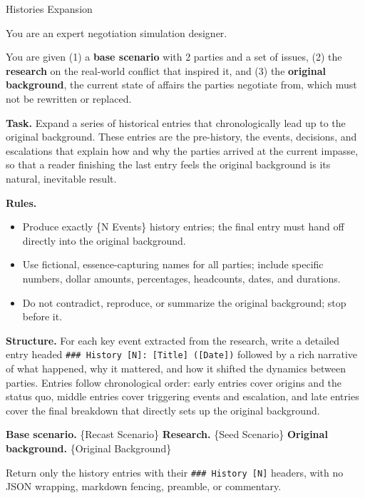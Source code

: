 \documentclass{llmxive}
\begin{document}
\begin{table}[p]
\centering
\begin{promptbox}{Histories Expansion}
\begin{userbox}
\scriptsize
You are an expert negotiation simulation designer.

\smallskip
You are given (1) a \textbf{base scenario} with 2 parties and a set of issues, (2) the \textbf{research} on the real-world conflict that inspired it, and (3) the \textbf{original background}, the current state of affairs the parties negotiate from, which must not be rewritten or replaced.

\smallskip
\textbf{Task.} Expand a series of historical entries that chronologically lead up to the original background. These entries are the pre-history, the events, decisions, and escalations that explain how and why the parties arrived at the current impasse, so that a reader finishing the last entry feels the original background is its natural, inevitable result.

\smallskip
\textbf{Rules.}
\begin{itemize}[leftmargin=*, noitemsep, topsep=2pt]
\item Produce exactly \{N Events\} history entries; the final entry must hand off directly into the original background.
\item Use fictional, essence-capturing names for all parties; include specific numbers, dollar amounts, percentages, headcounts, dates, and durations.
\item Do not contradict, reproduce, or summarize the original background; stop before it.
\end{itemize}

\smallskip
\textbf{Structure.} For each key event extracted from the research, write a detailed entry headed \texttt{\#\#\# History [N]: [Title] ([Date])} followed by a rich narrative of what happened, why it mattered, and how it shifted the dynamics between parties. Entries follow chronological order: early entries cover origins and the status quo, middle entries cover triggering events and escalation, and late entries cover the final breakdown that directly sets up the original background.

\smallskip
\textbf{Base scenario.} \{Recast Scenario\} \quad \textbf{Research.} \{Seed Scenario\} \quad \textbf{Original background.} \{Original Background\}

\smallskip
Return only the history entries with their \texttt{\#\#\# History [N]} headers, with no JSON wrapping, markdown fencing, preamble, or commentary.
\end{userbox}
\end{promptbox}
\vspace{-0.25cm}
\vspace{-0.3cm}
\label{tab:prompt-history-exp}
\caption{Prompt for history-axis expansion.}
\end{table}
\end{document}
